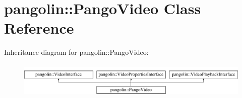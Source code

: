 \hypertarget{classpangolin_1_1_pango_video}{}\section{pangolin\+:\+:Pango\+Video Class Reference}
\label{classpangolin_1_1_pango_video}
Inheritance diagram for pangolin\+:\+:Pango\+Video\+:\begin{figure}[H]
\begin{center}
\leavevmode
\includegraphics[height=1.736434cm]{classpangolin_1_1_pango_video}
\end{center}
\end{figure}
